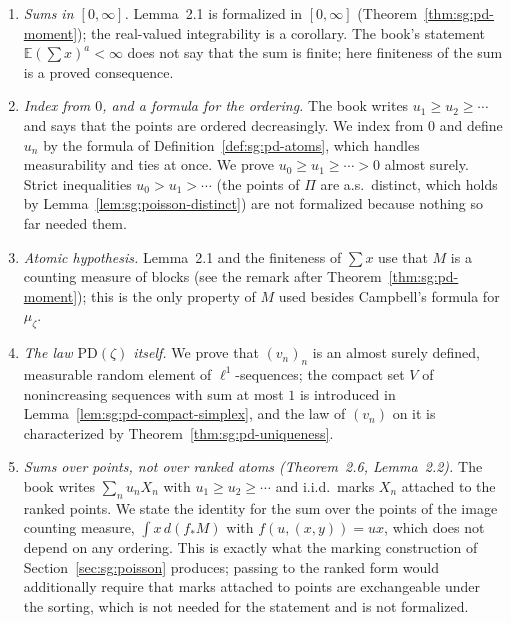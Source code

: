 \begin{remark}\label{rem:sg:pd}
\begin{enumerate}
\item \emph{Sums in $[0,\infty]$.} Lemma~2.1 is formalized in $[0,\infty]$ (Theorem~\ref{thm:sg:pd-moment}); the real-valued integrability is a corollary. The book's statement $\mathbb E(\sum x)^a<\infty$ does not say that the sum is finite; here finiteness of the sum is a proved consequence.
\item \emph{Index from $0$, and a formula for the ordering.} The book writes $u_1\ge u_2\ge\cdots$ and says that the points are ordered decreasingly. We index from $0$ and define $u_n$ by the formula of Definition~\ref{def:sg:pd-atoms}, which handles measurability and ties at once. We prove $u_0\ge u_1\ge\cdots>0$ almost surely. Strict inequalities $u_0>u_1>\cdots$ (the points of $\Pi$ are a.s.\ distinct, which holds by Lemma~\ref{lem:sg:poisson-distinct}) are not formalized because nothing so far needed them.
\item \emph{Atomic hypothesis.} Lemma~2.1 and the finiteness of $\sum x$ use that $M$ is a counting measure of blocks (see the remark after Theorem~\ref{thm:sg:pd-moment}); this is the only property of $M$ used besides Campbell's formula for $\mu_\zeta$.
\item \emph{The law $\mathrm{PD}(\zeta)$ itself.} We prove that $(v_n)_n$ is an almost surely defined, measurable random element of $\ell^1$-sequences; the compact set $V$ of nonincreasing sequences with sum at most $1$ is introduced in Lemma~\ref{lem:sg:pd-compact-simplex}, and the law of $(v_n)$ on it is characterized by Theorem~\ref{thm:sg:pd-uniqueness}.
\item \emph{Sums over points, not over ranked atoms (Theorem~2.6, Lemma~2.2).} The book writes $\sum_nu_nX_n$ with $u_1\ge u_2\ge\cdots$ and i.i.d.\ marks $X_n$ attached to the ranked points. We state the identity for the sum over the points of the image counting measure, $\int x\,d(f_*M)$ with $f(u,(x,y))=ux$, which does not depend on any ordering. This is exactly what the marking construction of Section~\ref{sec:sg:poisson} produces; passing to the ranked form would additionally require that marks attached to points are exchangeable under the sorting, which is not needed for the statement and is not formalized.

\end{enumerate}
\end{remark}
